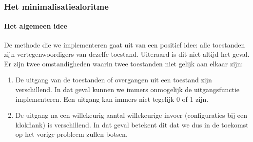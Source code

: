 \subsubsection{Het minimalisatiealoritme}
\paragraph{Het algemeen idee}De methode die we implementeren gaat uit van een positief idee: alle toestanden zijn vertegenwoordigers van dezelfe toestand. Uiteraard is dit niet altijd het geval. Er zijn twee omstandigheden waarin twee toestanden niet gelijk aan elkaar zijn:
\begin{enumerate}
 \item De uitgang van de toestanden of overgangen uit een toestand zijn verschillend. In dat geval kunnen we immers onmogelijk de uitgangsfunctie implementeren. Een uitgang kan immers niet tegelijk 0 of 1 zijn.
 \item De uitgang na een willekeurig aantal willekeurige invoer (configuraties bij een klokflank) is verschillend. In dat geval betekent dit dat we dus in de toekomst op het vorige probleem zullen botsen.
\end{enumerate}
